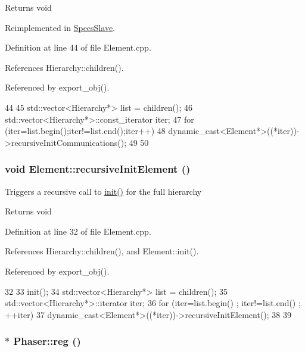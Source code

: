 \begin{DoxyReturn}{Returns}
void 
\end{DoxyReturn}


Reimplemented in \hyperlink{classSpecsSlave_a347b94c2ba660ccde6927fe72590a1bc}{SpecsSlave}.

Definition at line 44 of file Element.cpp.

References Hierarchy::children().

Referenced by export\_\-obj().


\begin{DoxyCode}
44                                          {
45   std::vector<Hierarchy*> list = children();
46   std::vector<Hierarchy*>::const_iterator iter;
47   for (iter=list.begin();iter!=list.end();iter++){
48     dynamic_cast<Element*>((*iter))->recursiveInitCommunications();
49   }
50 }
\end{DoxyCode}
\hypertarget{classElement_a3c0abcb36f8906688bb7e32608df7086}{
\subsubsection[{recursiveInitElement}]{\setlength{\rightskip}{0pt plus 5cm}void Element::recursiveInitElement ()}}
\label{classElement_a3c0abcb36f8906688bb7e32608df7086}
Triggers a recursive call to \hyperlink{classElement_af42754b5cabc198869222725218d695c}{init()} for the full hierarchy

\begin{DoxyReturn}{Returns}
void 
\end{DoxyReturn}


Definition at line 32 of file Element.cpp.

References Hierarchy::children(), and Element::init().

Referenced by export\_\-obj().


\begin{DoxyCode}
32                                   {
33   init();
34   std::vector<Hierarchy*> list = children();
35   std::vector<Hierarchy*>::iterator iter;
36   for (iter=list.begin() ; iter!=list.end() ; ++iter){
37     dynamic_cast<Element*>((*iter))->recursiveInitElement();
38   }
39 }
\end{DoxyCode}
\hypertarget{classPhaser_a3a4b64dc36e5f74292d9bec55da077a7}{
\subsubsection[{reg}]{$\ast$ Phaser::reg ()}}
\label{classPhaser_a3a4b64dc36e5f74292d9bec55da077a7}


